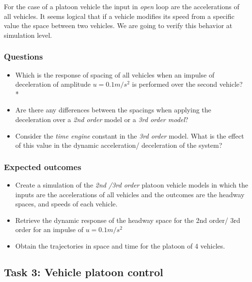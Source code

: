 \documentclass[]{book}
\providecommand{\tightlist}{%
  \setlength{\itemsep}{0pt}\setlength{\parskip}{0pt}}
\theoremstyle{definition}
\theoremstyle{definition}
\theoremstyle{definition}
\theoremstyle{remark}
\begin{document}
For the case of a platoon vehicle the input in \emph{open} loop are the
accelerations of all vehicles. It seems logical that if a vehicle
modifies its speed from a specific value the space between two vehicles.
We are going to verify this behavior at simulation level.

\hypertarget{questions-5}{%
\subsubsection*{Questions}\label{questions-5}}

\begin{itemize}
\tightlist
\item
  Which is the response of spacing of all vehicles when an impulse of
  deceleration of amplitude \(u = 0.1m/s^2\) is performed over the
  second vehicle? *
\item
  Are there any differences between the spacings when applying the
  deceleration over a \emph{2nd order} model or a \emph{3rd order
  model}?
\item
  Consider the \emph{time engine} constant in the \emph{3rd order}
  model. What is the effect of this value in the dynamic acceleration/
  deceleration of the system?
\end{itemize}

\hypertarget{expected-outcomes-5}{%
\subsubsection*{Expected outcomes}\label{expected-outcomes-5}}

\begin{itemize}
\tightlist
\item
  Create a simulation of the \emph{2nd /3rd order} platoon vehicle
  models in which the inputs are the accelerations of all vehicles and
  the outcomes are the headway spaces, and speeds of each vehicle.
\item
  Retrieve the dynamic response of the headway space for the 2nd order/
  3rd order for an impulse of \(u = 0.1m/s^2\)
\item
  Obtain the trajectories in space and time for the platoon of 4
  vehicles.
\end{itemize}

\hypertarget{task-3-vehicle-platoon-control}{%
\subsection*{Task 3: Vehicle platoon
control}\label{task-3-vehicle-platoon-control}}
\end{document}
